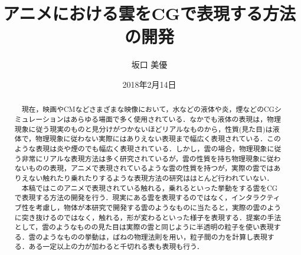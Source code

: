 \documentclass[11pt]{jreport}
\title{アニメにおける雲をCGで表現する方法の開発}
\author{坂口 美優}
\date{2018年2月14日}	%
\begin{document}
\maketitle

\begin{abstract}
　現在，映画やCMなどさまざまな映像において，水などの液体や炎，煙などのCGシミュレーションはあらゆる場面で多く使用されている．なかでも液体の表現は，物理現象に従う現実のものと見分けがつかないほどリアルなものから，性質(見た目)は液体で，物理現象に従わない実際にはありえない表現まで幅広く表現されている．このような表現は炎や煙のでも幅広く表現されている．しかし，雲の場合，物理現象に従う非常にリアルな表現方法は多く研究されているが，雲の性質を持ち物理現象に従わないものの表現，アニメで表現されているような雲の性質を持つが，実際の雲ではありえない触れたり乗れたりするような表現方法の研究ははとんど行われていない．\\
　本稿ではこのアニメで表現されている触れる，乗れるといった挙動をする雲をCGで表現する方法の開発を行う．現実にある雲を表現するのではなく，インタラクティブ性を考慮し，物体が本研究で開発する雲のようなものに当たると，実際の雲のように突き抜けるのではなく，触れる，形が変わるといった様子を表現する．提案の手法として，雲のようなものの見た目は実際の雲と同じように半透明の粒子を使い表現する．雲のようなものの挙動は，ばねの物理法則を用い，粒子間の力を計算し表現する．ある一定以上の力が加わると千切れる表も表現も行う．\\



\end{abstract}

\tableofcontents



\newpage
{}	%


　
\end{document}
